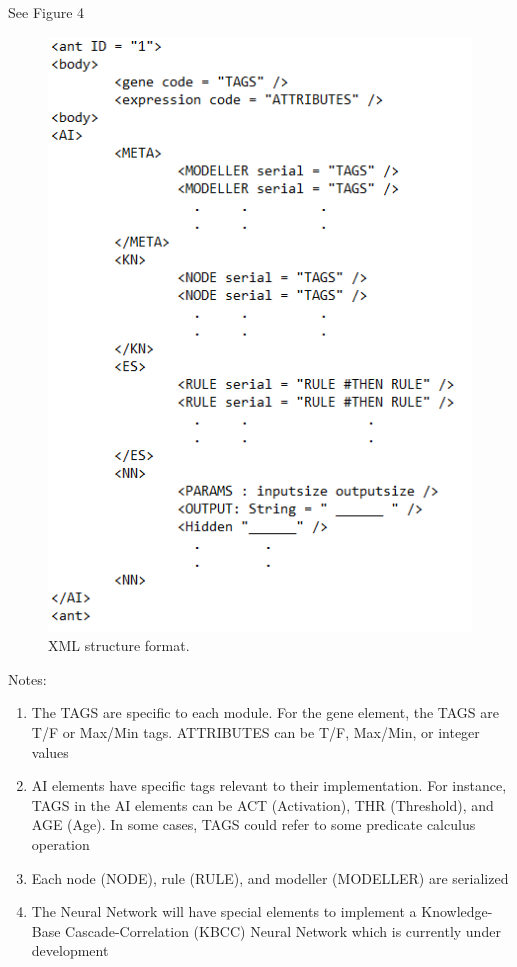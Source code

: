 \documentclass[titlepage, 12pt]{article}
\begin{document}
See Figure 4 \\
\newpage
\begin{figure}[h!]
    \centering
    \includegraphics{xml.png}
    \caption{XML structure format.}
\end{figure}

\noindent Notes: 
\begin{enumerate}
\item The TAGS are specific to each module. For the gene element, the TAGS are T/F or Max/Min tags. ATTRIBUTES can be T/F, Max/Min, or integer values
\item AI elements have specific tags relevant to their implementation. For instance, TAGS in the AI elements can be ACT (Activation), THR (Threshold), and AGE (Age). In some cases, TAGS could refer to some predicate calculus operation
\item Each node (NODE), rule (RULE), and modeller (MODELLER) are serialized
\item The Neural Network will have special elements to implement a Knowledge-Base Cascade-Correlation (KBCC) Neural Network which is currently under development
\end{enumerate}
\end{document}
